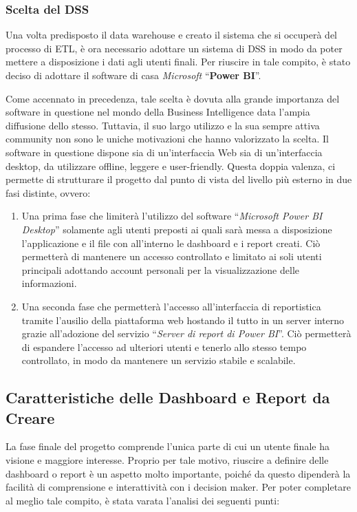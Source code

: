 \subsubsection{Scelta del DSS}

Una volta predisposto il data warehouse e creato il sistema che si occuperà del processo di ETL, è ora necessario adottare un sistema di DSS in modo da poter mettere a disposizione i dati agli utenti finali. Per riuscire in tale compito, è stato deciso di adottare il software di casa \textit{Microsoft} ``\textbf{Power BI}''. 

Come accennato in precedenza, tale scelta è dovuta alla grande importanza del software in questione nel mondo della Business Intelligence data l'ampia diffusione dello stesso. Tuttavia, il suo largo utilizzo e la sua sempre attiva community non sono le uniche motivazioni che hanno valorizzato la scelta. Il software in questione dispone sia di un'interfaccia Web sia di un'interfaccia desktop, da utilizzare offline, leggere e user-friendly. Questa doppia valenza, ci permette di strutturare il progetto dal punto di vista del livello più esterno in due fasi distinte, ovvero: 

\begin{enumerate}
    \item Una prima fase che limiterà l'utilizzo del software ``\textit{Microsoft Power BI Desktop}'' solamente agli utenti preposti ai quali sarà messa a disposizione l'applicazione e il file con all'interno le dashboard e i report creati. Ciò permetterà di mantenere un accesso controllato e limitato ai soli utenti principali adottando account personali per la visualizzazione delle informazioni.
    \item Una seconda fase che permetterà l'accesso all'interfaccia di reportistica tramite l'ausilio della piattaforma web hostando il tutto in un server interno grazie all'adozione del servizio ``\textit{Server di report di Power BI}''. Ciò permetterà di espandere l'accesso ad ulteriori utenti e tenerlo allo stesso tempo controllato, in modo da mantenere un servizio stabile e scalabile.
\end{enumerate}

\subsection{Caratteristiche delle Dashboard e Report da Creare}

La fase finale del progetto comprende l'unica parte di cui un utente finale ha visione e maggiore interesse. Proprio per tale motivo, riuscire a definire delle dashboard o report è un aspetto molto importante, poiché da questo dipenderà la facilità di comprensione e interattività con i decision maker. Per poter completare al meglio tale compito, è stata varata l'analisi dei seguenti punti:


